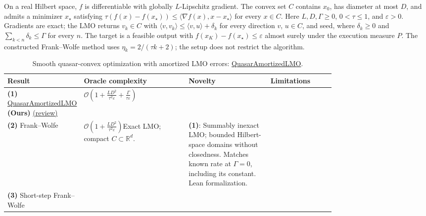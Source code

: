 \begin{table}[tp]
\centering
\caption{Smooth quasar-convex optimization with amortized LMO errors: \href{https://github.com/k3nfalt/longtails/blob/main/LongTails/Setups/QuasarAmortizedLMO.lean}{QuasarAmortizedLMO}.}\label{tab:QuasarAmortizedLMO}
\parbox{\linewidth}{\footnotesize On a real Hilbert space, $f$ is differentiable with globally $L$-Lipschitz gradient. The convex set $C$ contains $x_0$, has diameter at most $D$, and admits a minimizer $x_\star$ satisfying $\tau(f(x)-f(x_\star))\le\langle\nabla f(x),x-x_\star\rangle$ for every $x\in C$. Here $L,D,\Gamma\ge0$, $0<\tau\le1$, and $\varepsilon>0$. Gradients are exact; the LMO returns $v_k\in C$ with $\langle v,v_k\rangle\le\langle v,u\rangle+\delta_k$ for every direction $v$, $u\in C$, and seed, where $\delta_k\ge0$ and $\sum_{k<n}\delta_k\le\Gamma$ for every $n$. The target is a feasible output with $f(x_K)-f(x_\star)\le\varepsilon$ almost surely under the execution measure $P$. The constructed Frank--Wolfe method uses $\eta_k=2/(\tau k+2)$; the setup does not restrict the algorithm.}\par\smallskip
\begin{threeparttable}
\footnotesize
\setlength{\tabcolsep}{4pt}\renewcommand{\arraystretch}{1.25}
\begin{tabularx}{\linewidth}{@{}>{\raggedright\arraybackslash}p{0.20\linewidth}>{\raggedright\arraybackslash}p{0.32\linewidth}>{\raggedright\arraybackslash}p{0.25\linewidth}>{\raggedright\arraybackslash}X@{}}
\toprule
\textbf{Result} & \textbf{Oracle complexity} & \textbf{Novelty} & \textbf{Limitations} \\
\midrule
\textbf{(1)} \href{https://github.com/k3nfalt/longtails/blob/main/LongTails/Theorems/QuasarAmortizedLMO.lean}{Quasar\allowbreak Amortized\allowbreak LMO} \textbf{(Ours)} \href{https://github.com/k3nfalt/longtails/blob/main/scripts/reviews/QuasarAmortizedLMO.md}{(review)}
& $\mathcal{O}\!\left(1+\frac{LD^2}{\tau^2\varepsilon}+\frac{\Gamma}{\tau\varepsilon}\right)$ & & \\
\midrule[1.2pt]
\textbf{(2)} Frank--Wolfe \citep[Thm.~9, Alg.~3, line~6]{qalmMartinezRubio2026v3}
& $\mathcal{O}\!\left(1+\frac{LD^2}{\tau^2\varepsilon}\right)$\newline Exact LMO; compact $C\subset\mathbb{R}^d$.
& \textbf{(1)}: Summably inexact LMO; bounded Hilbert-space domains without closedness. Matches known rate at $\Gamma=0$, including its constant. Lean formalization.
& \\
\midrule
\textbf{(3)} Short-step Frank--Wolfe \citep[Prop.~12]{qalmMartinezRubio2026v3}

\end{tabularx}
\end{threeparttable}
\end{table}
